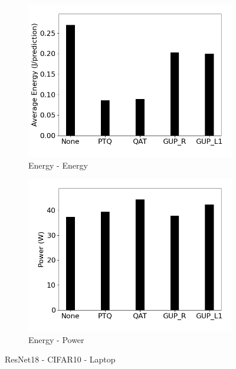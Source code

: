 \begin{figure}[]
\begin{subfigure}{0.19\textwidth}
        \includegraphics[width=1\textwidth]{other/figures/Resnet18_CIFAR10_Laptop/Energy.png}
        \caption{Energy -  Energy}
    \end{subfigure}
    \begin{subfigure}{0.19\textwidth}
        \includegraphics[width=1\textwidth]{other/figures/Resnet18_CIFAR10_Laptop/Power.png}
        \caption{Energy - Power}
    \end{subfigure}
    \caption{ResNet18 - CIFAR10 - Laptop}
    \label{fig:Resnet-cifar-laptop}
\end{figure}

